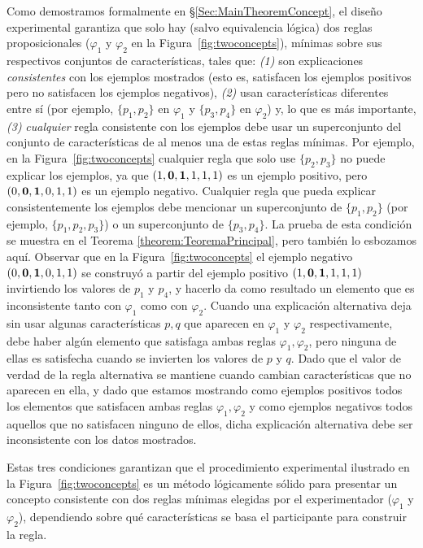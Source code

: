 \begin{enumerate}
	Como demostramos formalmente en \S\ref{Sec:MainTheoremConcept}, el diseño experimental garantiza que solo hay (salvo equivalencia lógica) dos reglas proposicionales ($\varphi_1$ y $\varphi_2$ en la Figura~\ref{fig:twoconcepts}), mínimas sobre sus respectivos conjuntos de características, tales que: \textit{(1)} son explicaciones \textit{consistentes} con los ejemplos mostrados (esto es, satisfacen los ejemplos positivos pero no satisfacen los ejemplos negativos), \textit{(2)} usan características diferentes entre sí (por ejemplo, $\{p_1, p_2 \}$ en $\varphi_1$ y $\{p_3, p_4 \}$ en $\varphi_2 $) y, lo que es más importante, \textit {(3)} \textit{cualquier} regla consistente con los ejemplos debe usar un superconjunto del conjunto de características de al menos una de estas reglas mínimas. Por ejemplo, en la Figura~\ref{fig:twoconcepts} cualquier regla que solo use $\{p_2, p_3 \}$ no puede explicar los ejemplos, ya que $(1, {\bf 0}, {\bf 1}, 1 , 1,1)$ es un ejemplo positivo, pero $(0, {\bf 0}, {\bf 1}, 0,1,1)$ es un ejemplo negativo. Cualquier regla que pueda explicar consistentemente los ejemplos debe mencionar un superconjunto de $\{p_1, p_2 \}$ (por ejemplo, $\{p_1, p_2, p_3 \}$) o un superconjunto de $\{p_3, p_4 \}$. La prueba de esta condición se muestra en el Teorema \ref{theorem:TeoremaPrincipal}, pero también lo esbozamos aquí. Observar que en la Figura~\ref{fig:twoconcepts} el ejemplo negativo $(0, {\bf 0}, {\bf 1}, 0,1,1)$ se construyó a partir del ejemplo positivo $(1, {\bf 0}, {\bf 1}, 1,1,1)$ invirtiendo los valores de $p_1$ y $p_4$, y hacerlo da como resultado un elemento que es inconsistente tanto con $\varphi_1$ como con $\varphi_2$. Cuando una explicación alternativa deja sin usar algunas características $p,q$ que aparecen en $\varphi_1$ y $\varphi_2$ respectivamente, debe haber algún elemento que satisfaga ambas reglas $\varphi_1, \varphi_2$, pero ninguna de ellas es satisfecha cuando se invierten los valores de $p$ y $q$. Dado que el valor de verdad de la regla alternativa se mantiene cuando cambian características que no aparecen en ella, y dado que estamos mostrando como ejemplos positivos todos los elementos que satisfacen ambas reglas $\varphi_1, \varphi_2$ y como ejemplos negativos todos aquellos que no satisfacen ninguno de ellos, dicha explicación alternativa debe ser inconsistente con los datos mostrados.

	Estas tres condiciones garantizan que el procedimiento experimental ilustrado en la Figura~\ref{fig:twoconcepts} es un método lógicamente sólido para presentar un concepto consistente con dos reglas mínimas elegidas por el experimentador ($\varphi_1$ y $\varphi_2$), dependiendo sobre qué características se basa el participante para construir la regla.    


\end{enumerate}
